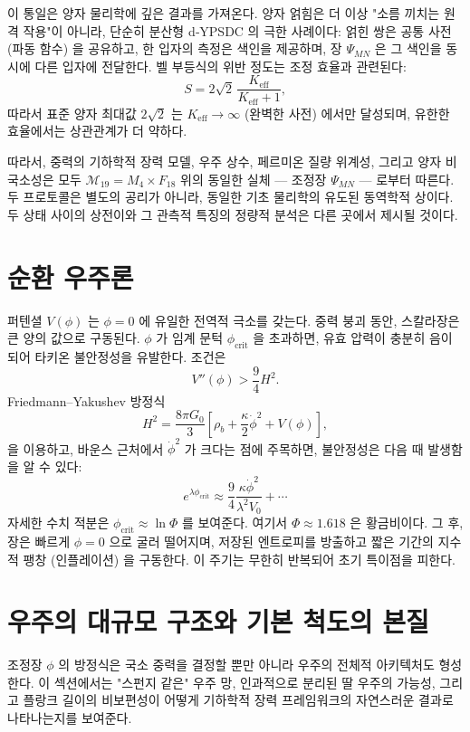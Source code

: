\documentclass[12pt,a4paper]{article}
\begin{document}
	이 통일은 양자 물리학에 깊은 결과를 가져온다. 양자 얽힘은 더 이상 "소름 끼치는 원격 작용"이 아니라, 단순히 분산형 d‑YPSDC 의 극한 사례이다: 얽힌 쌍은 공통 사전 (파동 함수) 을 공유하고, 한 입자의 측정은 색인을 제공하며, 장 \(\Psi_{MN}\) 은 그 색인을 동시에 다른 입자에 전달한다. 벨 부등식의 위반 정도는 조정 효율과 관련된다:
	\begin{equation}
		S = 2\sqrt{2}\,\frac{K_{\mathrm{eff}}}{K_{\mathrm{eff}}+1},
		\label{eq:bell-eff}
	\end{equation}
	따라서 표준 양자 최대값 \(2\sqrt{2}\) 는 \(K_{\mathrm{eff}}\to\infty\) (완벽한 사전) 에서만 달성되며, 유한한 효율에서는 상관관계가 더 약하다.
	
	따라서, 중력의 기하학적 장력 모델, 우주 상수, 페르미온 질량 위계성, 그리고 양자 비국소성은 모두 \(\mathcal{M}_{19}=M_4\times F_{18}\) 위의 동일한 실체 — 조정장 \(\Psi_{MN}\) — 로부터 따른다. 두 프로토콜은 별도의 공리가 아니라, 동일한 기초 물리학의 유도된 동역학적 상이다. 두 상태 사이의 상전이와 그 관측적 특징의 정량적 분석은 다른 곳에서 제시될 것이다.
	
	\section{순환 우주론}
	
	퍼텐셜 \(V(\phi)\) 는 \(\phi=0\) 에 유일한 전역적 극소를 갖는다. 중력 붕괴 동안, 스칼라장은 큰 양의 값으로 구동된다. \(\phi\) 가 임계 문턱 \(\phi_{\mathrm{crit}}\) 을 초과하면, 유효 압력이 충분히 음이 되어 타키온 불안정성을 유발한다. 조건은
	\[
	V''(\phi) > \frac{9}{4} H^2.
	\]
	Friedmann–Yakushev 방정식
	\[
	H^2 = \frac{8\pi G_0}{3} \left[ \rho_b + \frac{\kappa}{2}\dot\phi^2 + V(\phi) \right],
	\]
	을 이용하고, 바운스 근처에서 \(\dot\phi^2\) 가 크다는 점에 주목하면, 불안정성은 다음 때 발생함을 알 수 있다:
	\[
	e^{\lambda\phi_{\mathrm{crit}}} \approx \frac{9}{4} \frac{\kappa\dot\phi^2}{\lambda^2 V_0} + \cdots
	\]
	자세한 수치 적분은 \(\phi_{\mathrm{crit}} \approx \ln\Phi\) 를 보여준다. 여기서 \(\Phi \approx 1.618\) 은 황금비이다. 그 후, 장은 빠르게 \(\phi=0\) 으로 굴러 떨어지며, 저장된 엔트로피를 방출하고 짧은 기간의 지수적 팽창 (인플레이션) 을 구동한다. 이 주기는 무한히 반복되어 초기 특이점을 피한다.
	
	\section{우주의 대규모 구조와 기본 척도의 본질}
	\label{sec:sponge}
	
	조정장 \(\phi\) 의 방정식은 국소 중력을 결정할 뿐만 아니라 우주의 전체적 아키텍처도 형성한다. 이 섹션에서는 "스펀지 같은" 우주 망, 인과적으로 분리된 딸 우주의 가능성, 그리고 플랑크 길이의 비보편성이 어떻게 기하학적 장력 프레임워크의 자연스러운 결과로 나타나는지를 보여준다.
	
\end{document}
